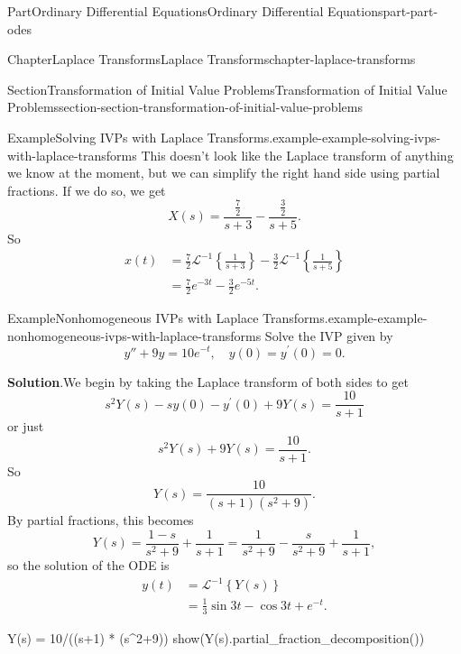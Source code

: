 \documentclass[twoside,10pt,]{book}
\newcommand{\blocktitlefont}{\relax}
\numberwithin{equation}{part}
\newcommand{\iLaplace}[1]{\mathcal{L}^{-1}\set{#1}}
\newcommand{\set}[1]{\left\{ #1 \right\}}
\begin{document}
\begin{partptx}{Part}{Ordinary Differential Equations}{}{Ordinary Differential Equations}{}{}{part-part-odes}
\begin{chapterptx}{Chapter}{Laplace Transforms}{}{Laplace Transforms}{}{}{chapter-laplace-transforms}
\begin{sectionptx}{Section}{Transformation of Initial Value Problems}{}{Transformation of Initial Value Problems}{}{}{section-section-transformation-of-initial-value-problems}
\begin{example}{Example}{Solving IVPs with Laplace Transforms.}{example-example-solving-ivps-with-laplace-transforms}
This doesn't look like the Laplace transform of anything we know at the moment, but we can simplify the right hand side using partial fractions. If we do so, we get%
\begin{equation*}
X(s) = \frac{\frac{7}{2}}{s+3} - \frac{\frac{3}{2}}{s+5}.
\end{equation*}
So%
\begin{align*}
x(t) &= \frac{7}{2}\mathcal{L}^{-1}\left\{\frac{1}{s+3}\right\} - \frac{3}{2}\mathcal{L}^{-1}\left\{\frac{1}{s+5}\right\}\\
&= \frac{7}{2}e^{-3t} - \frac{3}{2}e^{-5t}\text{.}
\end{align*}
%
\end{example}
\begin{example}{Example}{Nonhomogeneous IVPs with Laplace Transforms.}{example-example-nonhomogeneous-ivps-with-laplace-transforms}%
Solve the IVP given by%
\begin{equation*}
y''+9y = 10e^{-t},\quad y(0) = y^\prime(0) = 0.
\end{equation*}
%
\par\smallskip%
\noindent\textbf{\blocktitlefont Solution}.\hypertarget{solution-example-nonhomogeneous-ivps-with-laplace-transforms-c}{}\quad{}We begin by taking the Laplace transform of both sides to get%
\begin{equation*}
s^{2}Y(s) - sy(0) - y^\prime(0) + 9Y(s) = \frac{10}{s+1}
\end{equation*}
or just%
\begin{equation*}
s^{2}Y(s) + 9Y(s) = \frac{10}{s+1}.
\end{equation*}
So%
\begin{equation*}
Y(s) = \frac{10}{(s+1)(s^{2}+9)}.
\end{equation*}
By partial fractions, this becomes%
\begin{equation*}
Y(s) = \frac{1-s}{s^{2}+9} + \frac{1}{s+1} = \frac{1}{s^{2}+9} - \frac{s}{s^{2}+9} + \frac{1}{s+1},
\end{equation*}
so the solution of the ODE is%
\begin{align*}
y(t) & = \iLaplace{Y(s)}\\
&= \frac{1}{3}\sin3t -\cos3t + e^{-t}\text{.}
\end{align*}
%
\end{example}
\begin{sageinput}
Y(s) = 10/((s+1) * (s^2+9))
show(Y(s).partial_fraction_decomposition())
\end{sageinput}

\end{sectionptx}
\end{chapterptx}
\end{partptx}
\end{document}

